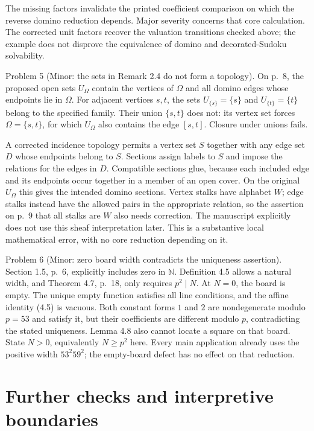 \documentclass[10pt]{article}
\begin{document}
The missing factors invalidate the printed coefficient comparison on which the reverse domino reduction depends. Major severity concerns that core calculation. The corrected unit factors recover the valuation transitions checked above; the example does not disprove the equivalence of domino and decorated-Sudoku solvability.\par
Problem 5 (Minor: the sets in Remark 2.4 do not form a topology).  On p. 8, the proposed open sets \(U_\Omega\) contain the vertices of \(\Omega\) and all domino edges whose endpoints lie in \(\Omega\). For adjacent vertices \(s,t\), the sets \(U_{\{s\}}=\{s\}\) and \(U_{\{t\}}=\{t\}\) belong to the specified family. Their union \(\{s,t\}\) does not: its vertex set forces \(\Omega=\{s,t\}\), for which \(U_\Omega\) also contains the edge \([s,t]\). Closure under unions fails.\par
A corrected incidence topology permits a vertex set \(S\) together with any edge set \(D\) whose endpoints belong to \(S\). Sections assign labels to \(S\) and impose the relations for the edges in \(D\). Compatible sections glue, because each included edge and its endpoints occur together in a member of an open cover. On the original \(U_\Omega\) this gives the intended domino sections. Vertex stalks have alphabet \(W\); edge stalks instead have the allowed pairs in the appropriate relation, so the assertion on p. 9 that all stalks are \(W\) also needs correction. The manuscript explicitly does not use this sheaf interpretation later. This is a substantive local mathematical error, with no core reduction depending on it.\par
Problem 6 (Minor: zero board width contradicts the uniqueness assertion).  Section 1.5, p. 6, explicitly includes zero in \(\mathbb N\). Definition 4.5 allows a natural width, and Theorem 4.7, p. 18, only requires \(p^2\mid N\). At \(N=0\), the board is empty. The unique empty function satisfies all line conditions, and the affine identity (4.5) is vacuous. Both constant forms \(1\) and \(2\) are nondegenerate modulo \(p=53\) and satisfy it, but their coefficients are different modulo \(p\), contradicting the stated uniqueness. Lemma 4.8 also cannot locate a square on that board. State \(N>0\), equivalently \(N\ge p^2\) here. Every main application already uses the positive width \(53^2 59^2\); the empty-board defect has no effect on that reduction.\par
\section*{Further checks and interpretive boundaries}
\end{document}
